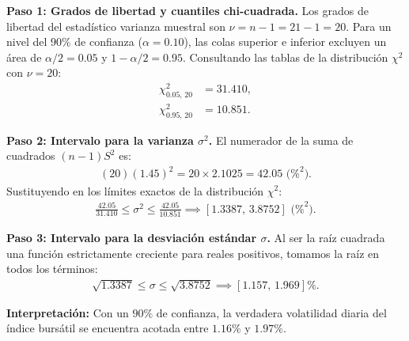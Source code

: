 \begin{solproblema}
	\textbf{Paso 1: Grados de libertad y cuantiles chi-cuadrada.}
	Los grados de libertad del estadístico varianza muestral son $\nu = n - 1 = 21 - 1 = 20$.
	Para un nivel del $90\%$ de confianza ($\alpha = 0.10$), las colas superior e inferior excluyen un área de $\alpha/2 = 0.05$ y $1-\alpha/2 = 0.95$. Consultando las tablas de la distribución $\chi^2$ con $\nu = 20$:
	\begin{align}
		\chi^2_{0.05, \, 20} &= 31.410, \\
		\chi^2_{0.95, \, 20} &= 10.851.
	\end{align}
	
	\textbf{Paso 2: Intervalo para la varianza $\sigma^2$.}
	El numerador de la suma de cuadrados $(n-1)S^2$ es:
	\begin{align}
		(20)(1.45)^2 = 20 \times 2.1025 = 42.05 \text{ (\%}^2\text{).}
	\end{align}
	Sustituyendo en los límites exactos de la distribución $\chi^2$:
	\begin{align}
		\frac{42.05}{31.410} \le \sigma^2 \le \frac{42.05}{10.851} \implies [1.3387, \, 3.8752] \text{ (\%}^2\text{).}
	\end{align}
	
	\textbf{Paso 3: Intervalo para la desviación estándar $\sigma$.}
	Al ser la raíz cuadrada una función estrictamente creciente para reales positivos, tomamos la raíz en todos los términos:
	\begin{align}
		\sqrt{1.3387} \le \sigma \le \sqrt{3.8752} \implies [1.157, \, 1.969] \%.
	\end{align}
	
	\textbf{Interpretación:} Con un $90\%$ de confianza, la verdadera volatilidad diaria del índice bursátil se encuentra acotada entre $1.16\%$ y $1.97\%$.
\end{solproblema}

